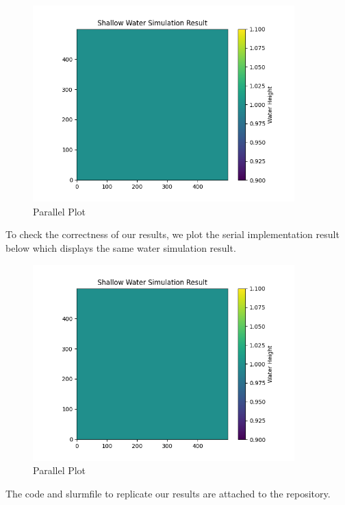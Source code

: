 \documentclass[a4paper,10pt]{article}
\begin{document}
\begin{figure}[H]
  \centering
  \includegraphics[width=0.9\textwidth]{img/ex5/parallel_plot.png}
  \caption{Parallel Plot}
  \label{fig:ex5_parallel}
\end{figure}

To check the correctness of our results, we plot the serial implementation result below which displays the same water simulation result.

\begin{figure}[H]
  \centering
  \includegraphics[width=0.9\textwidth]{img/ex5/serial_plot.png}
  \caption{Parallel Plot}
  \label{fig:ex5_serial}
\end{figure}


The code and slurmfile to replicate our results are attached to the repository.

\end{document}
